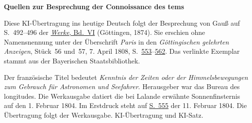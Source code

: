 \clearpage\thispagestyle{empty}
\begin{center}\textbf{Quellen zur Besprechung der Connoissance des tems}\end{center}
\noindent Diese KI-Übertragung ins heutige Deutsch folgt der Besprechung von Gauß auf S.~492--496 der \href{https://gdz.sub.uni-goettingen.de/id/PPN236007467}{\textit{Werke}, Bd.~VI} (Göttingen, 1874). Sie erschien ohne Namensnennung unter der Überschrift \emph{Paris} in den \textit{Göttingischen gelehrten Anzeigen}, Stück~56 und~57, 7. April 1808, S.~\href{https://api.digitale-sammlungen.de/iiif/image/v2/bsb10538673_00559/full/1800,/0/default.jpg}{553}--\href{https://api.digitale-sammlungen.de/iiif/image/v2/bsb10538673_00568/full/1800,/0/default.jpg}{562}. Das verlinkte Exemplar stammt aus der Bayerischen Staatsbibliothek.
\par\smallskip\noindent Der französische Titel bedeutet \emph{Kenntnis der Zeiten oder der Himmelsbewegungen zum Gebrauch für Astronomen und Seefahrer}. Herausgeber war das Bureau des longitudes. Die Werkausgabe datiert die bei Lalande erwähnte Sonnenfinsternis auf den 1. Februar 1804. Im Erstdruck steht auf \href{https://api.digitale-sammlungen.de/iiif/image/v2/bsb10538673_00561/full/1800,/0/default.jpg}{S.~555} der 11. Februar 1804. Die Übertragung folgt der Werkausgabe. KI-Übertragung und KI-Satz.
\clearpage
